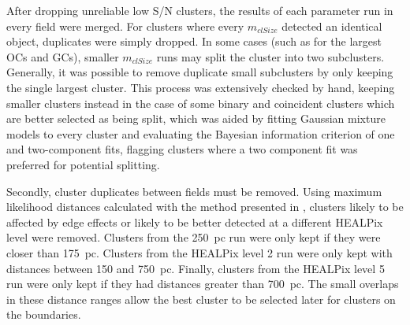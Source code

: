 
After dropping unreliable low S/N clusters, the results of each parameter run in every field were merged. For clusters where every $m_{clSize}$ detected an identical object, duplicates were simply dropped. In some cases (such as for the largest OCs and GCs), smaller $m_{clSize}$ runs may split the cluster into two subclusters. Generally, it was possible to remove duplicate small subclusters by only keeping the single largest cluster. This process was extensively checked by hand, keeping smaller clusters instead in the case of some binary and coincident clusters which are better selected as being split, which was aided by fitting Gaussian mixture models to every cluster and evaluating the Bayesian information criterion of one and two-component fits, flagging clusters where a two component fit was preferred for potential splitting.

Secondly, cluster duplicates between fields must be removed. Using maximum likelihood distances calculated with the method presented in \cite{cantat-gaudin_characterising_2018}, clusters likely to be affected by edge effects or likely to be better detected at a different HEALPix level were removed. Clusters from the 250~pc run were only kept if they were closer than 175~pc. Clusters from the HEALPix level 2 run were only kept with distances between 150 and 750~pc. Finally, clusters from the HEALPix level 5 run were only kept if they had distances greater than 700~pc. The small overlaps in these distance ranges allow the best cluster to be selected later for clusters on the boundaries.

